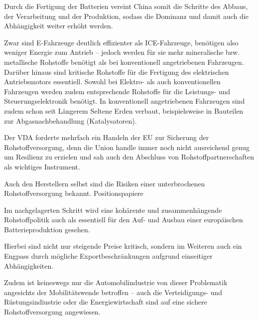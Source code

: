 \documentclass[12pt,a4paper,oneside]{book} %
\begin{document}
Durch die Fertigung der Batterien vereint China somit die Schritte des Abbaus, der Verarbeitung und der Produktion, sodass die Dominanz und damit auch die Abhängigkeit weiter erhöht werden.

 Zwar sind E-Fahrzeuge deutlich effizienter als ICE-Fahrzeuge, benötigen also weniger Energie zum Antrieb -- jedoch werden für sie mehr mineralische bzw. metallische Rohstoffe benötigt als bei konventionell angetriebenen Fahrzeugen. Darüber hinaus sind kritische Rohstoffe für die Fertigung des elektrischen Antriebsmotors essentiell. Sowohl bei Elektro- als auch konventionellen Fahrzeugen werden zudem entsprechende Rohstoffe für die Leistungs- und Steuerungselektronik benötigt. In konventionell angetriebenen Fahrzeugen sind zudem schon seit Längerem Seltene Erden verbaut, beispielsweise in Bauteilen zur Abgasnachbehandlung (Katalysatoren).

Der VDA forderte mehrfach ein Handeln der EU zur Sicherung der Rohstoffversorgung, denn die Union handle immer noch nicht ausreichend genug um Resilienz zu erzielen und sah auch den Abschluss von Rohstoffpartnerschaften als wichtiges Instrument.\autocite{Horizont  36-37 vom 04.09.2025  Seite 030 }

Auch den Herstellern selbst sind die Risiken einer unterbrochenen Rohstoffversorgung bekannt. Positionspapiere

Im nachgelagerten Schritt wird eine kohärente und zusammenhängende Rohstoffpolitik auch als essentiell für den Auf- und Ausbau einer europäischen Batterieproduktion gesehen.\autocite{bibid}

Hierbei sind nicht nur steigende Preise kritisch, sondern im Weiteren auch ein Engpass durch mögliche Exportbeschränkungen aufgrund einseitiger Abhängigkeiten.

Zudem ist keineswegs nur die Automobilindustrie von dieser Problematik angesichts der Mobilitätswende betroffen -- auch die Verteidigungs- und Rüstungsindiustrie oder die Energiewirtschaft sind auf eine sichere Rohstoffversorgung angewiesen.
\end{document}
